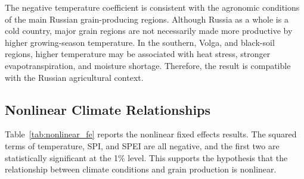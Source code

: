 \documentclass[12pt,a4paper]{article}
\begin{document}
The negative temperature coefficient is consistent with the agronomic conditions of the main Russian grain-producing regions. Although Russia as a whole is a cold country, major grain regions are not necessarily made more productive by higher growing-season temperature. In the southern, Volga, and black-soil regions, higher temperature may be associated with heat stress, stronger evapotranspiration, and moisture shortage. Therefore, the result is compatible with the Russian agricultural context.

\subsection{Nonlinear Climate Relationships}

Table~\ref{tab:nonlinear_fe} reports the nonlinear fixed effects results. The squared terms of temperature, SPI, and SPEI are all negative, and the first two are statistically significant at the 1\% level. This supports the hypothesis that the relationship between climate conditions and grain production is nonlinear.
\end{document}
